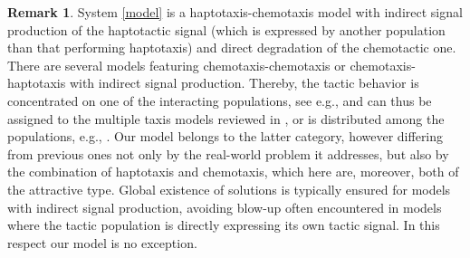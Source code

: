 \documentclass[a4paper,10pt]{article}
\theoremstyle{definition}
\newtheorem{Remark}[Theorem]{Remark}
\begin{document}
 \begin{Remark} System \eqref{model} is a haptotaxis-chemotaxis model with indirect signal production of the haptotactic signal (which is expressed by another population than that performing haptotaxis) and direct degradation of the chemotactic one. There are several models featuring chemotaxis-chemotaxis or chemotaxis-haptotaxis with indirect signal production. Thereby, the tactic behavior is concentrated on one of the interacting populations, see e.g.,  \cite{Chen2024,Mohan2026,surulescu2021does,Wang2023} and can thus be assigned to the multiple taxis models reviewed in \cite{Kolbe2021}, or is distributed among the populations, e.g.,  \cite{Mishra2022,Wu2025,Li2020}. Our model belongs to the latter category, however differing from previous ones not only by the real-world  problem it addresses, but also by the combination of haptotaxis and chemotaxis, which here are, moreover, both of the attractive type. Global existence of solutions is typically ensured for models with indirect signal production, avoiding blow-up often encountered in models where the tactic population is directly expressing its own tactic signal. In this respect our model is no exception.   
 	\end{Remark}

\end{document}
